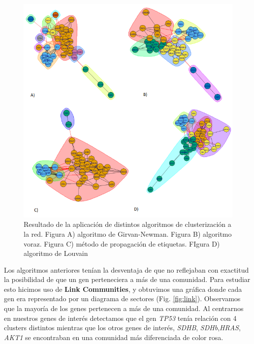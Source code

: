 \begin{figure}
	\centering
	\includegraphics[width=0.98\linewidth]{figures/algoritmos}
	\captionsetup{labelformat=empty}
	\caption{Resultado de la aplicación de distintos algoritmos de clusterización a la red. Figura A) algoritmo de Girvan-Newman. Figura B) algoritmo voraz. Figura C) método de propagación de etiquetas. FIgura D) algoritmo de Louvain}
	\label{fig:algoritmos}
\end{figure} 



Los algoritmos anteriores tenían la desventaja de que no reflejaban con exactitud la posibilidad de que un gen perteneciera a más de una comunidad. Para estudiar esto hicimos uso de \textbf{Link Communities}, y obtuvimos una gráfica donde cada gen era representado por un diagrama de sectores (Fig. \ref{fig:link}). Observamos que la mayoría de los genes pertenecen a más de una comunidad. Al centrarnos en nuestros genes de interés detectamos que el gen \textit{TP53} tenía relación con 4 clusters distintos mientras que los otros genes de interés, \textit{SDHB}, \textit{SDHb},\textit{HRAS}, \textit{AKT1} se encontraban en una comunidad más diferenciada de color rosa. 

